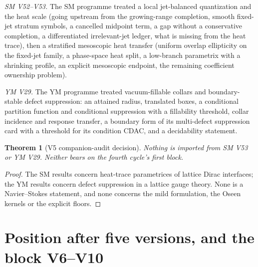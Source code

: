 \documentclass[11pt]{article}
\theoremstyle{plain}
\newtheorem{theorem}{Theorem}[section]
\theoremstyle{definition}
\theoremstyle{remark}
\begin{document}
\emph{SM V52--V53.}  The SM programme treated a local jet-balanced
quantization and the heat scale (going upstream from the
growing-range completion, smooth fixed-jet stratum symbols, a
cancelled midpoint term, a gap without a conservative completion, a
differentiated irrelevant-jet ledger, what is missing from the heat
trace), then a stratified mesoscopic heat transfer (uniform overlap
ellipticity on the fixed-jet family, a phase-space heat split, a
low-branch parametrix with a shrinking profile, an explicit
mesoscopic endpoint, the remaining coefficient ownership problem).

\emph{YM V29.}  The YM programme treated vacuum-fillable collars and
boundary-stable defect suppression: an attained radius, translated
boxes, a conditional partition function and conditional
suppression with a fillability threshold, collar incidence and
response transfer, a boundary form of its multi-defect suppression
card with a threshold for its condition CDAC, and a decidability
statement.

\begin{theorem}[V5 companion-audit decision]
\label{thm:c4v5-companion-decision}
Nothing is imported from SM V53 or YM V29.  Neither bears on the
fourth cycle's first block.
\end{theorem}

\begin{proof}
The SM results concern heat-trace parametrices of lattice Dirac
interfaces; the YM results concern defect suppression in a lattice
gauge theory.  None is a Navier--Stokes statement, and none concerns
the mild formulation, the Oseen kernels or the explicit floors.
\end{proof}

\section{Position after five versions, and the block V6--V10}
\label{sec:c4v5-position}
\end{document}
